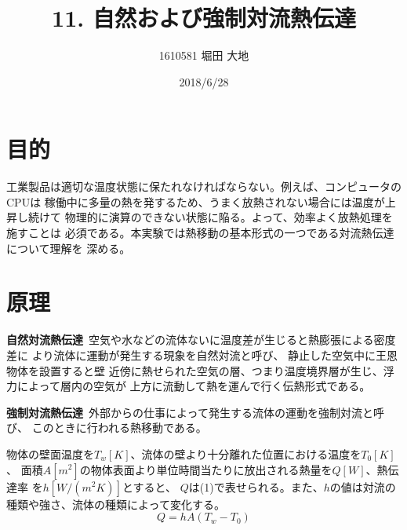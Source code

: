 \documentclass[twocolumn, 10pt,a4j]{jsarticle}
\title{\vspace{-2.5cm}11. 自然および強制対流熱伝達}
\author{1610581 堀田 大地}
\date{2018/6/28}
\begin{document}
\maketitle{}
\section{目的}
  工業製品は適切な温度状態に保たれなければならない。例えば、コンピュータのCPUは
  稼働中に多量の熱を発するため、うまく放熱されない場合には温度が上昇し続けて
  物理的に演算のできない状態に陥る。よって、効率よく放熱処理を施すことは
  必須である。本実験では熱移動の基本形式の一つである対流熱伝達について理解を
  深める。
\section{原理}
    {\bf 自然対流熱伝達}\ 空気や水などの流体ないに温度差が生じると熱膨張による密度差に
  より流体に運動が発生する現象を自然対流と呼び、
  静止した空気中に王恩物体を設置すると壁
  近傍に熱せられた空気の層、つまり温度境界層が生じ、浮力によって層内の空気が
  上方に流動して熱を運んで行く伝熱形式である。
    \par{\bf 強制対流熱伝達}\ 外部からの仕事によって発生する流体の運動を強制対流と呼び、
  このときに行われる熱移動である。
  \\[1ex]\par
    物体の壁面温度を$T_{w}[K]$、流体の壁より十分離れた位置における温度を$T_{0}[K]$、
  面積$A[m^{2}]$の物体表面より単位時間当たりに放出される熱量を$Q[W]$、熱伝達率
  を$h[W/(m^{2}K)]$とすると、
  $Q$は(1)で表せられる。また、$h$の値は対流の種類や強さ、流体の種類によって変化する。
  \begin{equation}
    Q = hA(T_{w} - T_{0})
  \end{equation}
\end{document}

